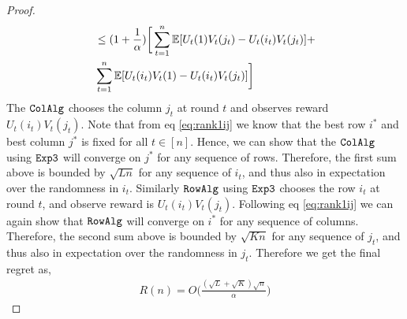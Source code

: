 \begin{proof}
\begin{align*}
& \leq (1 + \frac{1}{\alpha}) \bigg[\sum_{t = 1}^n \mathbb{E}[{U_t(1) V_t(j_t) - U_t(i_t) V_t(j_t)}] + \\
& \sum_{t = 1}^n \mathbb{E}[{U_t(i_t) V_t(1) - U_t(i_t) V_t(j_t)}]\bigg]
\end{align*}
The ${\tt ColAlg}$ chooses the column $j_t$ at round $t$ and observes reward $U_t(i_t) V_t(j_t)$. Note that from eq \eqref{eq:rank1ij} we know that the best row $i^*$ and best column $j^*$ is fixed for all $t\in [n]$. Hence, we can show that the ${\tt ColAlg}$ using ${\tt Exp3}$ will converge on $j^*$ for any sequence of rows. Therefore, the first sum above is bounded by $\sqrt{L n}$ for any sequence of $i_t$, and thus also in expectation over the randomness in $i_t$. Similarly ${\tt RowAlg}$ using ${\tt Exp3}$ chooses the row $i_t$ at round $t$, and observe reward is $U_t(i_t) V_t(j_t)$. Following eq \eqref{eq:rank1ij} we can again show that ${\tt RowAlg}$ will converge on $i^*$ for any sequence of columns. Therefore, the second sum above is bounded by $\sqrt{K n}$ for any sequence of $j_t$, and thus also in expectation over the randomness in $j_t$. Therefore we get the final regret as,
\begin{align*}
  R(n) = O\bigg(\frac{(\sqrt{L } + \sqrt{K })\sqrt{n}}{\alpha}\bigg)
\end{align*}
\end{proof}
